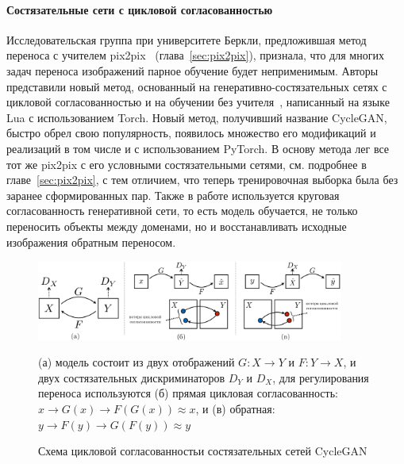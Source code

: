 \documentclass[11pt,a4paper]{extarticle}
\begin{document}
		\paragraph{Состязательные сети с цикловой согласованностью}

			Исследовательская группа при университете Беркли, предложившая метод переноса с учителем pix2pix~\cite{pix2pix} (глава~\ref{sec:pix2pix}),
			признала, что для многих задач переноса изображений парное обучение будет неприменимым.
			Авторы представили новый метод, основанный на генеративно-состязательных сетях с цикловой согласованностью и на обучении без учителя~\cite{CycleGAN}, написанный на языке Lua с использованием Torch.
			Новый метод, получивший название CycleGAN, быстро обрел свою популярность, появилось множество его модификаций и реализаций в том числе и с использованием PyTorch.
			\newline
			\newline
			В основу метода лег все тот же pix2pix с его условными состязательными сетями, см. подробнее в главе~\ref{sec:pix2pix}, с тем отличием, что теперь тренировочная выборка была без заранее сформированных пар.
			Также в работе используется круговая согласованность генеративной сети, то есть модель обучается, не только переносить объекты между доменами, но и восстанавливать исходные изображения обратным переносом.
			
			\begin{figure}[ht]
				\centering
				\includegraphics[width=0.9\textwidth]{img/cyclegan}
				\caption{Схема цикловой согласованностьи состязательных сетей CycleGAN}{
					\small{
						(а) модель состоит из двух отображений \(G: X \rightarrow Y\) и \(F: Y \rightarrow X\), и двух состязательных дискриминаторов \(D_Y\) и \(D_X\),
						для регулирования переноса используются (б) прямая цикловая согласованность: \(x \rightarrow G(x) \rightarrow F(G(x)) \approx x \),
						и (в) обратная: \(y \rightarrow F(y) \rightarrow G(F(y)) \approx y \)
					}}
				\label{pic:cyclegan}
			\end{figure}
\end{document}

